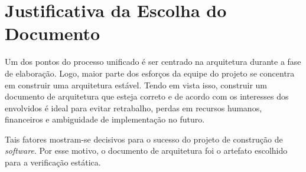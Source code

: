 \chapter{Justificativa da Escolha do Documento}

Um dos pontos do processo unificado é ser centrado na arquitetura durante a fase de elaboração. Logo, maior parte dos esforços da equipe do projeto se concentra em construir uma arquitetura estável. 
Tendo em vista isso, construir um documento de arquitetura que esteja correto  e de acordo com os interesses dos envolvidos é ideal para evitar retrabalho, perdas em recursos humanos, financeiros e ambiguidade de implementação no futuro. 

Tais fatores mostram-se decisivos para o sucesso do projeto de construção de \textit{software}. Por esse motivo, o documento de arquitetura foi o artefato escolhido para a verificação estática.
